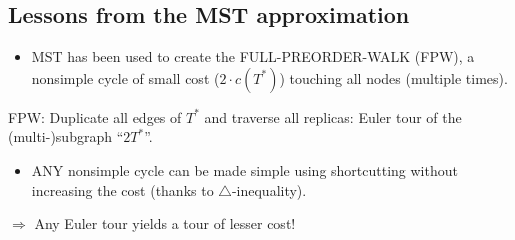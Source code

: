 \subsection{Lessons from the MST approximation}
\begin{itemize}
\item MST has been used to create the FULL-PREORDER-WALK (FPW), a nonsimple cycle of small cost ($2\cdot c(T^*)$) touching all nodes (multiple times).
\end{itemize}
FPW: Duplicate all edges of $T^*$ and traverse all replicas: Euler tour of the (multi-)subgraph ``$2T^*$''.
\begin{itemize}
\item ANY nonsimple cycle can be made simple using shortcutting without increasing the cost (thanks to $\triangle$-inequality).
\end{itemize}
$\Rightarrow$ Any Euler tour yields a tour of lesser cost!
